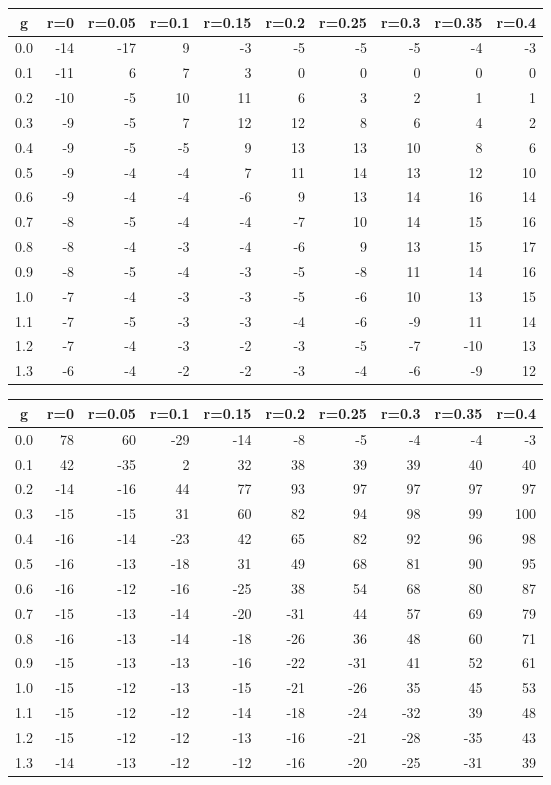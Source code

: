 %
\begin{table}[!tbp]
 \begin{center}
 \begin{tabular}{rrrrrrrrrr}\hline\hline
\multicolumn{1}{c}{g}&\multicolumn{1}{c}{r=0}&\multicolumn{1}{c}{r=0.05}&\multicolumn{1}{c}{r=0.1}&\multicolumn{1}{c}{r=0.15}&\multicolumn{1}{c}{r=0.2}&\multicolumn{1}{c}{r=0.25}&\multicolumn{1}{c}{r=0.3}&\multicolumn{1}{c}{r=0.35}&\multicolumn{1}{c}{r=0.4}\tabularnewline
\hline
0.0&-14&-17& 9&-3&-5&-5&-5& -4&-3\tabularnewline
0.1&-11&  6& 7& 3& 0& 0& 0&  0& 0\tabularnewline
0.2&-10& -5&10&11& 6& 3& 2&  1& 1\tabularnewline
0.3& -9& -5& 7&12&12& 8& 6&  4& 2\tabularnewline
0.4& -9& -5&-5& 9&13&13&10&  8& 6\tabularnewline
0.5& -9& -4&-4& 7&11&14&13& 12&10\tabularnewline
0.6& -9& -4&-4&-6& 9&13&14& 16&14\tabularnewline
0.7& -8& -5&-4&-4&-7&10&14& 15&16\tabularnewline
0.8& -8& -4&-3&-4&-6& 9&13& 15&17\tabularnewline
0.9& -8& -5&-4&-3&-5&-8&11& 14&16\tabularnewline
1.0& -7& -4&-3&-3&-5&-6&10& 13&15\tabularnewline
1.1& -7& -5&-3&-3&-4&-6&-9& 11&14\tabularnewline
1.2& -7& -4&-3&-2&-3&-5&-7&-10&13\tabularnewline
1.3& -6& -4&-2&-2&-3&-4&-6& -9&12\tabularnewline
\hline
\end{tabular}

\end{center}

\end{table}

%
\begin{table}[!tbp]
 \begin{center}
 \begin{tabular}{rrrrrrrrrr}\hline\hline
\multicolumn{1}{c}{g}&\multicolumn{1}{c}{r=0}&\multicolumn{1}{c}{r=0.05}&\multicolumn{1}{c}{r=0.1}&\multicolumn{1}{c}{r=0.15}&\multicolumn{1}{c}{r=0.2}&\multicolumn{1}{c}{r=0.25}&\multicolumn{1}{c}{r=0.3}&\multicolumn{1}{c}{r=0.35}&\multicolumn{1}{c}{r=0.4}\tabularnewline
\hline
0.0& 78& 60&-29&-14& -8& -5& -4& -4& -3\tabularnewline
0.1& 42&-35&  2& 32& 38& 39& 39& 40& 40\tabularnewline
0.2&-14&-16& 44& 77& 93& 97& 97& 97& 97\tabularnewline
0.3&-15&-15& 31& 60& 82& 94& 98& 99&100\tabularnewline
0.4&-16&-14&-23& 42& 65& 82& 92& 96& 98\tabularnewline
0.5&-16&-13&-18& 31& 49& 68& 81& 90& 95\tabularnewline
0.6&-16&-12&-16&-25& 38& 54& 68& 80& 87\tabularnewline
0.7&-15&-13&-14&-20&-31& 44& 57& 69& 79\tabularnewline
0.8&-16&-13&-14&-18&-26& 36& 48& 60& 71\tabularnewline
0.9&-15&-13&-13&-16&-22&-31& 41& 52& 61\tabularnewline
1.0&-15&-12&-13&-15&-21&-26& 35& 45& 53\tabularnewline
1.1&-15&-12&-12&-14&-18&-24&-32& 39& 48\tabularnewline
1.2&-15&-12&-12&-13&-16&-21&-28&-35& 43\tabularnewline
1.3&-14&-13&-12&-12&-16&-20&-25&-31& 39\tabularnewline
\hline
\end{tabular}

\end{center}

\end{table}


